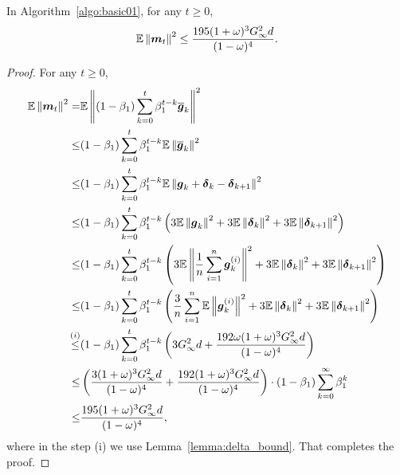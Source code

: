 \begin{lemma}
\label{lemma:momentum_bound}
In Algorithm~\ref{algo:basic01},
for any $t \geq 0$,
\begin{align*}
    \mathbb{E} \left\|\boldsymbol{m}_t\right\|^2 \leq \frac{195(1+\omega)^3G_\infty^2d}{(1-\omega)^4}.
\end{align*}
\end{lemma}
\begin{proof}
For any $t \geq 0$,
\begin{align*}
    \mathbb{E} \left\|\boldsymbol{m}_t\right\|^2 = & \mathbb{E} \left\| (1-\beta_1)\sum_{k=0}^{t}\beta_1^{t-k}\overline{\boldsymbol{g}}_k\right\|^2 \\
\leq & (1-\beta_1)\sum_{k=0}^{t}\beta_1^{t-k}\mathbb{E}\left\| \overline{\boldsymbol{g}}_k\right\|^2 \\
    \leq & (1-\beta_1)\sum_{k=0}^{t}\beta_1^{t-k}\mathbb{E}\left\| \boldsymbol{g}_k + {\boldsymbol{\delta}}_{k} - {\boldsymbol{\delta}}_{k+1}\right\|^2 \\
\leq & (1-\beta_1)\sum_{k=0}^{t}\beta_1^{t-k}\left( 3\mathbb{E}\left\| \boldsymbol{g}_k \right\|^2 + 3\mathbb{E}\left\| {\boldsymbol{\delta}}_{k} \right\|^2 + 3\mathbb{E}\left\| {\boldsymbol{\delta}}_{k+1}\right\|^2 \right) \\
    \leq & (1-\beta_1)\sum_{k=0}^{t}\beta_1^{t-k}\left( 3\mathbb{E}\left\| \frac{1}{n}\sum_{i=1}^{n}\boldsymbol{g}_k^{(i)} \right\|^2 + 3\mathbb{E}\left\| {\boldsymbol{\delta}}_{k} \right\|^2 + 3\mathbb{E}\left\| {\boldsymbol{\delta}}_{k+1}\right\|^2 \right) \\
\leq & (1-\beta_1)\sum_{k=0}^{t}\beta_1^{t-k}\left( \frac{3}{n}\sum_{i=1}^{n}\mathbb{E}\left\| \boldsymbol{g}_k^{(i)} \right\|^2 + 3\mathbb{E}\left\| {\boldsymbol{\delta}}_{k} \right\|^2 + 3\mathbb{E}\left\| {\boldsymbol{\delta}}_{k+1}\right\|^2 \right) \\
    \overset{(i)}{\leq} & (1-\beta_1)\sum_{k=0}^{t}\beta_1^{t-k}\left( 3G_\infty^2d + \frac{192\omega(1+\omega)^3 G_\infty^2d}{(1-\omega)^4} \right) \\
\leq & \left( \frac{3(1+\omega)^3 G_\infty^2d}{(1-\omega)^4} + \frac{192(1+\omega)^3 G_\infty^2d}{(1-\omega)^4} \right)\cdot (1-\beta_1)\sum_{k=0}^{\infty}\beta_1^{k} \\
    \leq & \frac{195(1+\omega)^3G_\infty^2d}{(1-\omega)^4},
\end{align*}
where in the step (i) we use Lemma~\ref{lemma:delta_bound}.
That completes the proof.
\end{proof}

